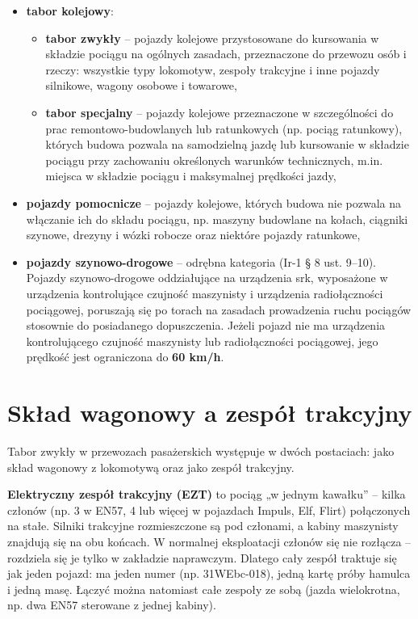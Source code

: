 \begin{itemize}
	\item \textbf{tabor kolejowy}:
	\begin{itemize}
		\item \textbf{tabor zwykły} – pojazdy kolejowe przystosowane do kursowania w składzie pociągu na ogólnych zasadach, przeznaczone do przewozu osób i rzeczy: wszystkie typy lokomotyw, zespoły trakcyjne i inne pojazdy silnikowe, wagony osobowe i towarowe,
		\item \textbf{tabor specjalny} – pojazdy kolejowe przeznaczone w szczególności do prac remontowo-budowlanych lub ratunkowych (np. pociąg ratunkowy), których budowa pozwala na samodzielną jazdę lub kursowanie w składzie pociągu przy zachowaniu określonych warunków technicznych, m.in. miejsca w składzie pociągu i maksymalnej prędkości jazdy,
	\end{itemize}
	\item \textbf{pojazdy pomocnicze} – pojazdy kolejowe, których budowa nie pozwala na włączanie ich do składu pociągu, np. maszyny budowlane na kołach, ciągniki szynowe, drezyny i wózki robocze oraz niektóre pojazdy ratunkowe,
	\item \textbf{pojazdy szynowo-drogowe} – odrębna kategoria (Ir-1 § 8 ust. 9–10). Pojazdy szynowo-drogowe oddziałujące na urządzenia srk, wyposażone w urządzenia kontrolujące czujność maszynisty i urządzenia radiołączności pociągowej, poruszają się po torach na zasadach prowadzenia ruchu pociągów stosownie do posiadanego dopuszczenia. Jeżeli pojazd nie ma urządzenia kontrolującego czujność maszynisty lub radiołączności pociągowej, jego prędkość jest ograniczona do \textbf{60 km/h}.
\end{itemize}

\section{Skład wagonowy a zespół trakcyjny}

Tabor zwykły w przewozach pasażerskich występuje w dwóch postaciach: jako skład wagonowy z lokomotywą oraz jako zespół trakcyjny.

\textbf{Elektryczny zespół trakcyjny (EZT)} to pociąg „w jednym kawałku” – kilka członów (np. 3 w EN57, 4 lub więcej w pojazdach Impuls, Elf, Flirt) połączonych na stałe. Silniki trakcyjne rozmieszczone są pod członami, a kabiny maszynisty znajdują się na obu końcach. W normalnej eksploatacji członów się nie rozłącza – rozdziela się je tylko w zakładzie naprawczym. Dlatego cały zespół traktuje się jak jeden pojazd: ma jeden numer (np. 31WEbc-018), jedną kartę próby hamulca i jedną masę. Łączyć można natomiast całe zespoły ze sobą (jazda wielokrotna, np. dwa EN57 sterowane z jednej kabiny).

